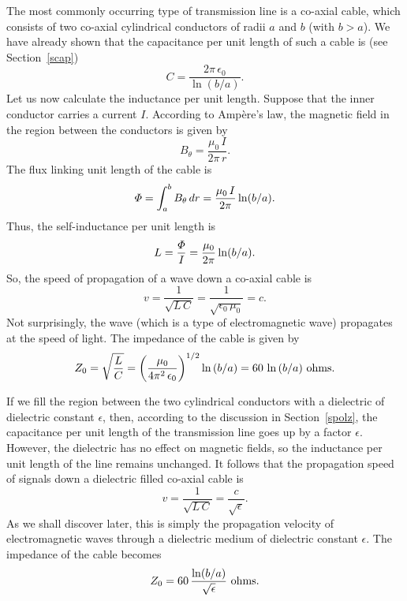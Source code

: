 The most commonly occurring type of
transmission line is a co-axial cable, which consists of
two co-axial cylindrical conductors of radii $a$ and $b$ (with $b>a$). We
have already shown that the capacitance per unit length of such a cable is
(see Section~\ref{scap})
\begin{equation}
C = \frac{ 2\pi\, \epsilon_0}{\ln (b/a)}.
\end{equation}
Let us now calculate the inductance per unit length. Suppose that the inner conductor
carries a current $I$. According to Amp\`{e}re's law, the magnetic field in the
region between the conductors is given by
\begin{equation}
B_\theta = \frac{\mu_0 \,I}{2\pi\, r}.
\end{equation}
The flux linking unit length of the cable is
\begin{equation}
{\mit\Phi} = \int_a^b B_\theta \,dr = \frac{\mu_0\, I}{2\pi} \ln(b/a).
\end{equation}
Thus, the self-inductance  per unit length is
\begin{equation}
L = \frac{{\mit\Phi}}{I} = \frac{\mu_0}{2\pi} \ln(b/a). 
\end{equation}
So, the speed of propagation of a wave down a co-axial cable is
\begin{equation}
v = \frac{1}{\sqrt{L\,C}} = \frac{1}{\sqrt{\epsilon_0 \,\mu_0}} = c.
\end{equation}
Not surprisingly, the wave (which is a type of electromagnetic wave) propagates at
the speed of light. The impedance of the cable is given by
\begin{equation}
Z_0 = \sqrt{\frac{L}{C} } = \left(\frac{\mu_0}{4\pi^2\, \epsilon_0}\right)^{1/2}
\ln\, (b/a) = 60 \,\ln\, (b/a) \,\,{\rm ohms}.
\end{equation}

If we fill the region between the two cylindrical conductors with a
dielectric of dielectric constant $\epsilon$, then, according to the
discussion in Section~\ref{spolz}, the capacitance per unit length
of the transmission line goes up by a factor $\epsilon$. However,
the dielectric has no effect on magnetic fields, so the inductance
per unit length of the line remains unchanged. It follows that the
propagation speed of signals down a dielectric filled co-axial cable
is
\begin{equation}
v = \frac{1}{\sqrt{L\,C}}= \frac{c}{\sqrt{\epsilon}}.
\end{equation}
As we shall discover later, this is simply the propagation velocity of electromagnetic waves
through a dielectric medium of dielectric constant $\epsilon$. The impedance of the cable
becomes
\begin{equation}\label{ez0}
Z_ 0 = 60\,\frac{\ln(b/a)}{\sqrt{\epsilon}}\,\,{\rm ohms}.
\end{equation}

